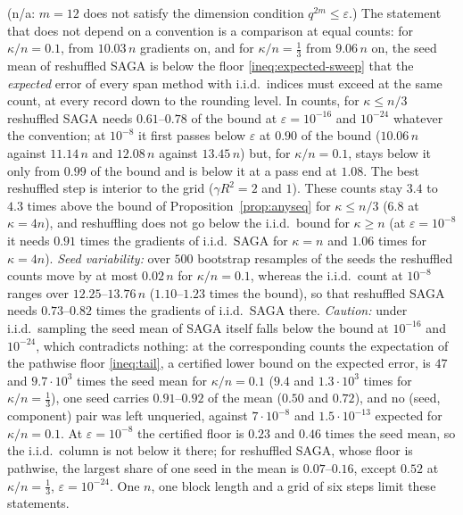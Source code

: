 \noindent (n/a: $m=12$ does not satisfy the dimension condition $q^{2m}\le\varepsilon$.) The statement that does not depend on a convention is a comparison at equal counts: for $\kappa/n=0.1$, from $10.03\,n$ gradients on, and for $\kappa/n=\frac13$ from $9.06\,n$ on, the seed mean of reshuffled SAGA is below the floor \eqref{ineq:expected-sweep} that the \emph{expected} error of every span method with i.i.d.\ indices must exceed at the same count, at every record down to the rounding level. In counts, for $\kappa\le n/3$ reshuffled SAGA needs $0.61$--$0.78$ of the bound at $\varepsilon=10^{-16}$ and $10^{-24}$ whatever the convention; at $10^{-8}$ it first passes below $\varepsilon$ at $0.90$ of the bound ($10.06\,n$ against $11.14\,n$ and $12.08\,n$ against $13.45\,n$) but, for $\kappa/n=0.1$, stays below it only from $0.99$ of the bound and is below it at a pass end at $1.08$. The best reshuffled step is interior to the grid ($\gamma R^2=2$ and $1$). These counts stay $3.4$ to $4.3$ times above the bound of Proposition~\ref{prop:anyseq} for $\kappa\le n/3$ ($6.8$ at $\kappa=4n$), and reshuffling does not go below the i.i.d.\ bound for $\kappa\ge n$ (at $\varepsilon=10^{-8}$ it needs $0.91$ times the gradients of i.i.d.\ SAGA for $\kappa=n$ and $1.06$ times for $\kappa=4n$). \emph{Seed variability:} over $500$ bootstrap resamples of the seeds the reshuffled counts move by at most $0.02\,n$ for $\kappa/n=0.1$, whereas the i.i.d.\ count at $10^{-8}$ ranges over $12.25$--$13.76\,n$ ($1.10$--$1.23$ times the bound), so that reshuffled SAGA needs $0.73$--$0.82$ times the gradients of i.i.d.\ SAGA there. \emph{Caution:} under i.i.d.\ sampling the seed mean of SAGA itself falls below the bound at $10^{-16}$ and $10^{-24}$, which contradicts nothing: at the corresponding counts the expectation of the pathwise floor \eqref{ineq:tail}, a certified lower bound on the expected error, is $47$ and $9.7\cdot10^3$ times the seed mean for $\kappa/n=0.1$ ($9.4$ and $1.3\cdot10^3$ times for $\kappa/n=\frac13$), one seed carries $0.91$--$0.92$ of the mean ($0.50$ and $0.72$), and no (seed, component) pair was left unqueried, against $7\cdot10^{-8}$ and $1.5\cdot10^{-13}$ expected for $\kappa/n=0.1$. At $\varepsilon=10^{-8}$ the certified floor is $0.23$ and $0.46$ times the seed mean, so the i.i.d.\ column is not below it there; for reshuffled SAGA, whose floor is pathwise, the largest share of one seed in the mean is $0.07$--$0.16$, except $0.52$ at $\kappa/n=\frac13$, $\varepsilon=10^{-24}$. One $n$, one block length and a grid of six steps limit these statements.
